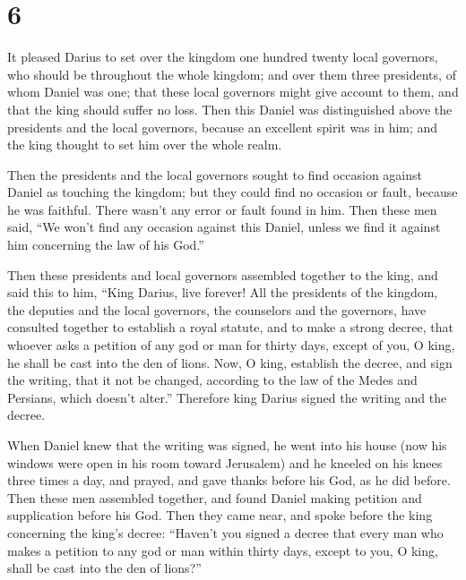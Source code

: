 \hypertarget{section-5}{%
\section{6}\label{section-5}}

 It pleased Darius to set over the kingdom one hundred
twenty local governors, who should be throughout the whole kingdom;
 and over them three presidents, of whom Daniel was one;
that these local governors might give account to them, and that the king
should suffer no loss.  Then this Daniel was distinguished
above the presidents and the local governors, because an excellent
spirit was in him; and the king thought to set him over the whole realm.

 Then the presidents and the local governors sought to find
occasion against Daniel as touching the kingdom; but they could find no
occasion or fault, because he was faithful. There wasn't any error or
fault found in him.  Then these men said, ``We won't find
any occasion against this Daniel, unless we find it against him
concerning the law of his God.''

 Then these presidents and local governors assembled
together to the king, and said this to him, ``King Darius, live forever!
 All the presidents of the kingdom, the deputies and the
local governors, the counselors and the governors, have consulted
together to establish a royal statute, and to make a strong decree, that
whoever asks a petition of any god or man for thirty days, except of
you, O king, he shall be cast into the den of lions.  Now, O
king, establish the decree, and sign the writing, that it not be
changed, according to the law of the Medes and Persians, which doesn't
alter.''  Therefore king Darius signed the writing and the
decree.

 When Daniel knew that the writing was signed, he went into
his house (now his windows were open in his room toward Jerusalem) and
he kneeled on his knees three times a day, and prayed, and gave thanks
before his God, as he did before.  Then these men assembled
together, and found Daniel making petition and supplication before his
God.  Then they came near, and spoke before the king
concerning the king's decree: ``Haven't you signed a decree that every
man who makes a petition to any god or man within thirty days, except to
you, O king, shall be cast into the den of lions?''

